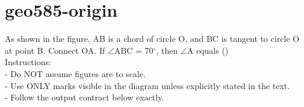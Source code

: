 \documentclass[12pt]{article}
\begin{document}
\section*{geo585-origin}
\noindent\begin{minipage}{\textwidth}
\setlength{\parskip}{4pt}
As shown in the figure, AB is a chord of circle O, and BC is tangent to circle O at point B. Connect OA. If \ensuremath{\angle }ABC = 70\ensuremath{^\circ}, then \ensuremath{\angle }A equals ()\\
Instructions:\\
- Do NOT assume figures are to scale.\\
- Use ONLY marks visible in the diagram unless explicitly stated in the text.\\
- Follow the output contract below exactly.\\
\end{minipage}
\end{document}
